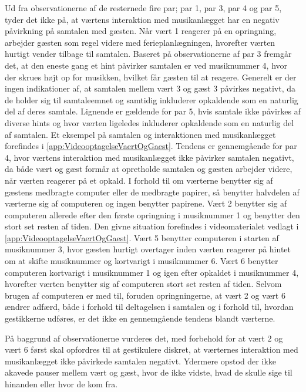 Ud fra observationerne af de resternede fire par; par 1, par 3, par 4 og par 5, tyder det ikke på, at værtens interaktion med musikanlægget har en negativ påvirkning på samtalen med gæsten. Når vært 1 reagerer på en opringning, arbejder gæsten som regel videre med ferieplanlægningen, hvorefter værten hurtigt vender tilbage til samtalen. Baseret på observationerne af par 3 fremgår det, at den eneste gang et hint påvirker samtalen er ved musiknummer 4, hvor der skrues højt op for musikken, hvilket får gæsten til at reagere. Generelt er der ingen indikationer af, at samtalen mellem vært 3 og gæst 3 påvirkes negativt, da de holder sig til samtaleemnet og samtidig inkluderer opkaldende som en naturlig del af deres samtale. Lignende er gældende for par 5, hvis samtale ikke påvirkes af diverse hints og hvor værten ligeledes inkluderer opkaldende som en naturlig del af samtalen. Et eksempel på samtalen og interaktionen med musikanlægget forefindes i \autoref{app:VideooptagelseVaertOgGaest}. Tendens er gennemgående for par 4, hvor værtens interaktion med musikanlægget ikke påvirker samtalen negativt, da både vært og gæst formår at opretholde samtalen og gæsten arbejder videre, når værten reagerer på et opkald. \blankline
%
I forhold til om værterne benytter sig af gæstens medbragte computer eller de medbragte papirer, så benytter halvdelen af værterne sig af computeren og ingen benytter papirene. Vært 2 benytter sig af computeren allerede efter den første opringning i musiknummer 1 og benytter den stort set resten af tiden. Den givne situation forefindes i videomaterialet vedlagt i \autoref{app:VideooptagelseVaertOgGaest}. Vært 5 benytter computeren i starten af musiknummer 3, hvor gæsten hurtigt overtager inden værten reagerer på hintet om at skifte musiknummer og kortvarigt i musiknummer 6. Vært 6 benytter computeren kortvarigt i musiknummer 1 og igen efter opkaldet i musiknummer 4, hvorefter værten benytter sig af computeren stort set resten af tiden. Selvom brugen af computeren er med til, foruden opringningerne, at vært 2 og vært 6 ændrer adfærd, både i forhold til deltagelsen i samtalen og i forhold til, hvordan gestikkerne udføres, er det ikke en gennemgående tendens blandt værterne.   

På baggrund af observationerne vurderes det, med forbehold for at vært 2 og vært 6 først skal opfordres til at gestikulere diskret, at værternes interaktion med musikanlægget ikke påvirkede samtalen negativt. Ydermere opstod der ikke akavede pauser mellem vært og gæst, hvor de ikke vidste, hvad de skulle sige til hinanden eller hvor de kom fra. 

